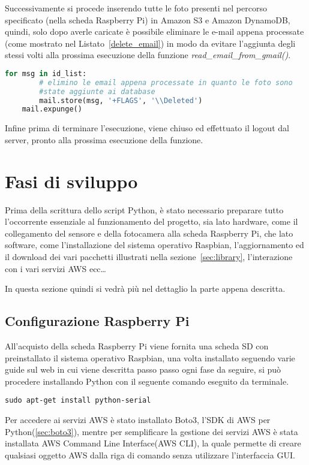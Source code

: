 Successivamente si procede inserendo tutte le foto presenti nel percorso specificato (nella scheda Raspberry Pi) in Amazon S3 e Amazon DynamoDB, quindi, solo dopo 
averle caricate è possibile eliminare le e-mail appena processate (come mostrato nel Listato~\ref{delete_email}) in modo da evitare l'aggiunta degli stessi volti alla 
prossima esecuzione della funzione \textit{read\_email\_from\_gmail()}.
\begin{lstlisting}[language=Python,frame=single,caption=Codice che elimina le e-mail,captionpos=t,label=delete_email]
    for msg in id_list: 
        # elimino le email appena processate in quanto le foto sono 
        #state aggiunte ai database
        mail.store(msg, '+FLAGS', '\\Deleted') 
    mail.expunge()
\end{lstlisting}
Infine prima di terminare l'esecuzione, viene chiuso ed effettuato il logout dal server, pronto alla prossima esecuzione della funzione.

\section{Fasi di sviluppo}
\label{sec:phases_of_development}
Prima della scrittura dello script Python, è stato necessario preparare tutto l'occorrente essenziale al funzionamento del progetto, sia lato hardware, come il 
collegamento del sensore e della fotocamera alla scheda Raspberry Pi, che lato software, come l'installazione del sistema operativo Raspbian, l'aggiornamento ed il 
download dei vari pacchetti illustrati nella sezione~\ref{sec:library}, l'interazione con i vari servizi AWS ecc\dots

In questa sezione quindi si vedrà più nel dettaglio la parte appena descritta.

\subsection{Configurazione Raspberry Pi}
All'acquisto della scheda Raspberry Pi viene fornita una scheda SD con preinstallato il sistema operativo Raspbian, una volta installato seguendo varie guide sul web
in cui viene descritta passo passo ogni fase da seguire, si può procedere installando Python con il seguente comando eseguito da terminale.
\begin{lstlisting}[frame=lines]
    sudo apt-get install python-serial
\end{lstlisting}
Per accedere ai servizi AWS è stato installato Boto3, l'SDK di AWS per Python(\ref{sec:boto3}), mentre per semplificare la gestione dei servizi AWS è stata installata
AWS Command Line Interface(AWS CLI), la quale permette di creare qualsiasi oggetto AWS dalla riga di comando senza utilizzare l'interfaccia GUI.

